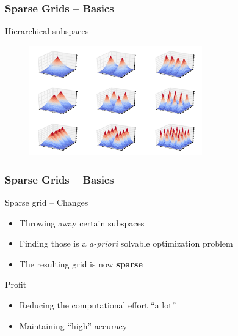 \begin{frame}
  \frametitle{Sparse Grids -- Basics}
  \topline
  \vspace{-10px}
  \begin{block}{Hierarchical subspaces}
    \begin{figure}[!htp]
      \centering
      \includegraphics[width=7.5cm]{images/sparsegrid_2dhats}
      \vspace{-12px}
      \caption{}
    \end{figure}
  \end{block}
\end{frame}

\begin{frame}
  \frametitle{Sparse Grids -- Basics}
  \topline
  \vspace{-10px}
  \begin{block}{Sparse grid -- Changes}
    \begin{itemize}
      \item Throwing away certain subspaces
      \item Finding those is a \emph{a-priori} solvable optimization problem
      \item The resulting grid is now \textbf{sparse}
      \end{itemize}
  \end{block}
  \begin{block}{Profit}
    \begin{itemize}
      \item Reducing the computational effort ``a lot''
      \item Maintaining ``high'' accuracy
      \end{itemize}
  \end{block}
\end{frame}

